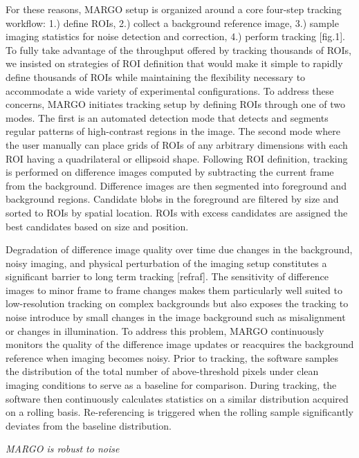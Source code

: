 \documentclass[10pt]{article}
\begin{document}
\begin{multicols}{2}
For these reasons, MARGO setup is organized around a core four-step tracking workflow: 1.) define ROIs, 2.) collect a background reference image, 3.) sample imaging statistics for noise detection and correction, 4.) perform tracking [fig.1]. To fully take advantage of the throughput offered by tracking thousands of ROIs, we insisted on strategies of ROI definition that would make it simple to rapidly define thousands of ROIs while maintaining the flexibility necessary to accommodate a wide variety of experimental configurations. To address these concerns, MARGO initiates tracking setup by defining ROIs through one of two modes. The first is an automated detection mode that detects and segments regular patterns of high-contrast regions in the image. The second mode where the user manually can place grids of ROIs of any arbitrary dimensions with each ROI having a quadrilateral or ellipsoid shape. Following ROI definition, tracking is performed on difference images computed by subtracting the current frame from the background. Difference images are then segmented into foreground and background regions. Candidate blobs in the foreground are filtered by size and sorted to ROIs by spatial location. ROIs with excess candidates are assigned the best candidates based on size and position.

Degradation of difference image quality over time due changes in the background, noisy imaging, and physical perturbation of the imaging setup constitutes a significant barrier to long term tracking [refraf]. The sensitivity of difference images to minor frame to frame changes makes them particularly well suited to low-resolution tracking on complex backgrounds but also exposes the tracking to noise introduce by small changes in the image background such as misalignment or changes in illumination. To address this problem, MARGO continuously monitors the quality of the difference image updates or reacquires the background reference when imaging becomes noisy. Prior to tracking, the software samples the distribution of the total number of above-threshold pixels under clean imaging conditions to serve as a baseline for comparison.  During tracking, the software then continuously calculates statistics on a similar distribution acquired on a rolling basis.  Re-referencing is triggered when the rolling sample significantly deviates from the baseline distribution.

\textit{MARGO is robust to noise}


\end{multicols}
\end{document}
